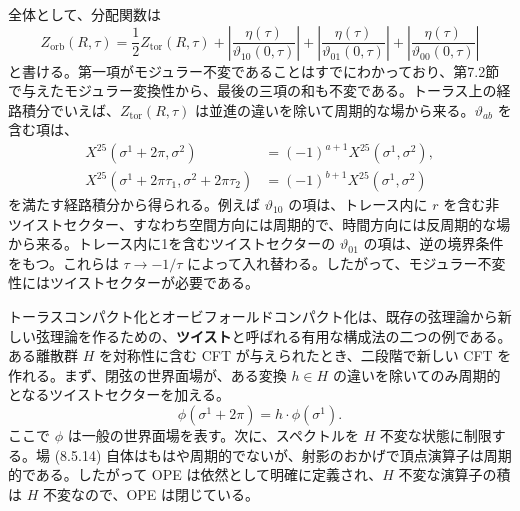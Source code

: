 全体として、分配関数は
\begin{equation}
Z_{\mathrm{orb}}(R,\tau)=\frac12Z_{\mathrm{tor}}(R,\tau)
+\left|\frac{\eta(\tau)}{\vartheta_{10}(0,\tau)}\right|
+\left|\frac{\eta(\tau)}{\vartheta_{01}(0,\tau)}\right|
+\left|\frac{\eta(\tau)}{\vartheta_{00}(0,\tau)}\right|
\tag{8.5.12}\label{eq:8.5.12}
\end{equation}
と書ける。第一項がモジュラー不変であることはすでにわかっており、第7.2節で与えたモジュラー変換性から、最後の三項の和も不変である。トーラス上の経路積分でいえば、$Z_{\mathrm{tor}}(R,\tau)$ は並進の違いを除いて周期的な場から来る。$\vartheta_{ab}$ を含む項は、
\begin{align}
X^{25}(\sigma^1+2\pi,\sigma^2)
&=(-1)^{a+1}X^{25}(\sigma^1,\sigma^2),
\tag{8.5.13a}\label{eq:8.5.13a}\\
X^{25}(\sigma^1+2\pi\tau_1,\sigma^2+2\pi\tau_2)
&=(-1)^{b+1}X^{25}(\sigma^1,\sigma^2)
\tag{8.5.13b}\label{eq:8.5.13b}
\end{align}
を満たす経路積分から得られる。例えば $\vartheta_{10}$ の項は、トレース内に $r$ を含む非ツイストセクター、すなわち空間方向には周期的で、時間方向には反周期的な場から来る。トレース内に1を含むツイストセクターの $\vartheta_{01}$ の項は、逆の境界条件をもつ。これらは $\tau\to-1/\tau$ によって入れ替わる。したがって、モジュラー不変性にはツイストセクターが必要である。


トーラスコンパクト化とオービフォールドコンパクト化は、既存の弦理論から新しい弦理論を作るための、\textbf{ツイスト}と呼ばれる有用な構成法の二つの例である。ある離散群 $H$ を対称性に含む CFT が与えられたとき、二段階で新しい CFT を作れる。まず、閉弦の世界面場が、ある変換 $h\in H$ の違いを除いてのみ周期的となるツイストセクターを加える。
\begin{equation}
\phi(\sigma^1+2\pi)=h\cdot\phi(\sigma^1).
\tag{8.5.14}\label{eq:8.5.14}
\end{equation}
ここで $\phi$ は一般の世界面場を表す。次に、スペクトルを $H$ 不変な状態に制限する。場 (8.5.14) 自体はもはや周期的でないが、射影のおかげで頂点演算子は周期的である。したがって OPE は依然として明確に定義され、$H$ 不変な演算子の積は $H$ 不変なので、OPE は閉じている。

